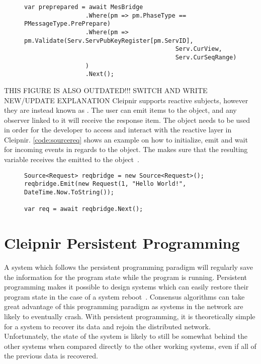 \begin{figure}[H]
	\centering
	\begin{lstlisting}[label = code:operatorreq, caption=Chaining Cleipnir Operators, captionpos=b, basicstyle=\scriptsize]
var preprepared = await MesBridge
                 .Where(pm => pm.PhaseType == PMessageType.PrePrepare)
                 .Where(pm => pm.Validate(Serv.ServPubKeyRegister[pm.ServID],
                                          Serv.CurView,
                                          Serv.CurSeqRange)
                 )
                 .Next();
\end{lstlisting}
\end{figure}
THIS  FIGURE IS ALSO OUTDATED!!! SWITCH AND WRITE NEW/UPDATE EXPLANATION
Cleipnir supports reactive subjects, however they are instead known as . The user can emit items to the  object, and any observer linked to it will receive the response item. The  object needs to be used in order for the developer to access and interact with the reactive layer in Cleipnir. \autoref{code:sourcereq} shows an example on how to initialize, emit and wait for incoming events in regards to the  object. The  makes sure that the resulting variable  receives the  emitted to the  object~\cite[p.~8]{PAPER:PaxosCleipnir}.

\begin{figure}[H]
	\centering
	\begin{lstlisting}[label = code:sourcereq, caption=Source object example, captionpos=b, basicstyle=\scriptsize]
Source<Request> reqbridge = new Source<Request>();
reqbridge.Emit(new Request(1, "Hello World!", DateTime.Now.ToString());

var req = await reqbridge.Next();
	\end{lstlisting}
\end{figure}

\section{Cleipnir Persistent Programming}
\label{section:PersistentProgramming}
A system which follows the persistent programming paradigm will regularly save the information for the program state while the program is running. Persistent programming makes it possible to design systems which can easily restore their program state in the case of a system reboot~\cites[p.~6]{PAPER:PaxosCleipnir}{DOC:Cleipnir}. Consensus algorithms can take great advantage of this programming paradigm as systems in the network are likely to eventually crash. With persistent programming, it is theoretically simple for a system to recover its data and rejoin the distributed network. Unfortunately, the state of the system is likely to still be somewhat behind the other systems when compared directly to the other working systems, even if all of the previous data is recovered. 

